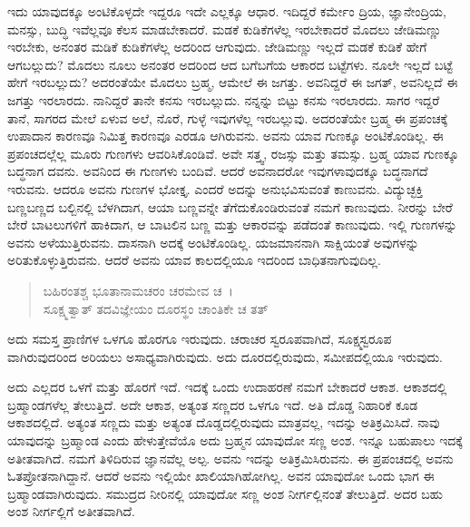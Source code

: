ಇದು ಯಾವುದಕ್ಕೂ ಅಂಟಿಕೊಳ್ಳದೇ ಇದ್ದರೂ ಇದೇ ಎಲ್ಲಕ್ಕೂ ಆಧಾರ. ಇದಿದ್ದರೆ ಕರ್ಮೇಂ ದ್ರಿಯ, ಜ್ಞಾನೇಂದ್ರಿಯ, ಮನಸ್ಸು, ಬುದ್ಧಿ ಇವೆಲ್ಲವೂ ಕೆಲಸ ಮಾಡಬೇಕಾದರೆ. ಮಡಕೆ ಕುಡಿಕೆಗಳೆಲ್ಲ ಇರಬೇಕಾದರೆ ಮೊದಲು ಜೇಡಿಮಣ್ಣು ಇರಬೇಕು, ಅನಂತರ ಮಡಿಕೆ ಕುಡಿಕೆಗಳೆಲ್ಲ ಅದರಿಂದ ಆಗುವುದು. ಜೇಡಿಮಣ್ಣು ಇಲ್ಲದೆ ಮಡಕೆ ಕುಡಿಕೆ ಹೇಗೆ ಆಗಬಲ್ಲುದು? ಮೊದಲು ನೂಲು ಅನಂತರ ಅದರಿಂದ ಆದ ಬಗೆಬಗೆಯ ಆಕಾರದ ಬಟ್ಟೆಗಳು. ನೂಲೇ ಇಲ್ಲದೆ ಬಟ್ಟೆ ಹೇಗೆ ಇರಬಲ್ಲುದು? ಅದರಂತೆಯೇ ಮೊದಲು ಬ್ರಹ್ಮ, ಆಮೇಲೆ ಈ ಜಗತ್ತು. ಅವನಿದ್ದರೆ ಈ ಜಗತ್, ಅವನಿಲ್ಲದೆ ಈ ಜಗತ್ತು ಇರಲಾರದು. ನಾನಿದ್ದರೆ ತಾನೇ ಕನಸು ಇರಬಲ್ಲುದು. ನನ್ನನ್ನು ಬಿಟ್ಟು ಕನಸು ಇರಲಾರದು. ಸಾಗರ ಇದ್ದರೆ ತಾನೆ, ಸಾಗರದ ಮೇಲೆ ಏಳುವ ಅಲೆ, ನೊರೆ, ಗುಳ್ಳೆ ಇವುಗಳೆಲ್ಲ ಇರಬಲ್ಲುವು. ಅದರಂತೆಯೇ ಬ್ರಹ್ಮ ಈ ಪ್ರಪಂಚಕ್ಕೆ ಉಪಾದಾನ ಕಾರಣವೂ ನಿಮಿತ್ತ ಕಾರಣವೂ ಎರಡೂ ಆಗಿರುವನು. ಅವನು ಯಾವ ಗುಣಕ್ಕೂ ಅಂಟಿಕೊಂಡಿಲ್ಲ. ಈ ಪ್ರಪಂಚದಲ್ಲೆಲ್ಲ ಮೂರು ಗುಣಗಳು ಆವರಿಸಿಕೊಂಡಿವೆ. ಅವೇ ಸತ್ತ್ವ, ರಜಸ್ಸು ಮತ್ತು ತಮಸ್ಸು. ಬ್ರಹ್ಮ ಯಾವ ಗುಣಕ್ಕೂ ಬದ್ಧನಾಗ ದವನು. ಅವನಿಂದ ಈ ಗುಣಗಳು ಬಂದಿವೆ. ಆದರೆ ಅವನಾದರೋ ಇವುಗಳಾವುದಕ್ಕೂ ಬದ್ಧನಾಗದೆ ಇರುವನು. ಆದರೂ ಅವನು ಗುಣಗಳ ಭೋಕ್ತೃ. ಎಂದರೆ ಅದನ್ನು ಅನುಭವಿಸುವಂತೆ ಕಾಣುವನು. ವಿದ್ಯುಚ್ಛಕ್ತಿ ಬಣ್ಣಬಣ್ಣದ ಬಲ್ಬಿನಲ್ಲಿ ಬೆಳಗಿದಾಗ, ಆಯಾ ಬಣ್ಣವನ್ನೇ ತೆಗೆದುಕೊಂಡಿರುವಂತೆ ನಮಗೆ ಕಾಣುವುದು. ನೀರನ್ನು ಬೇರೆ ಬೇರೆ ಬಾಟಲುಗಳಿಗೆ ಹಾಕಿದಾಗ, ಆ ಬಾಟಲಿನ ಬಣ್ಣ ಮತ್ತು ಆಕಾರವನ್ನು ಪಡೆದಂತೆ ಕಾಣುವುದು. ಇಲ್ಲಿ ಗುಣಗಳನ್ನು ಅವನು ಅಳೆಯುತ್ತಿರುವನು. ದಾಸನಾಗಿ ಅದಕ್ಕೆ ಅಂಟಿಕೊಂಡಿಲ್ಲ. ಯಜಮಾನನಾಗಿ ಸಾಕ್ಷಿಯಂತೆ ಅವುಗಳನ್ನು ಅರಿತುಕೊಳ್ಳುತ್ತಿರುವನು. ಆದರೆ ಅವನು ಯಾವ ಕಾಲದಲ್ಲಿಯೂ ಇದರಿಂದ ಬಾಧಿತನಾಗುವುದಿಲ್ಲ.

\begin{verse}
ಬಹಿರಂತಶ್ಚ ಭೂತಾನಾಮಚರಂ ಚರಮೇವ ಚ~।\\ಸೂಕ್ಷ್ಮತ್ವಾತ್ ತದವಿಜ್ಞೇಯಂ ದೂರಸ್ಥಂ ಚಾಂತಿಕೇ ಚ ತತ್ 
\end{verse}

{\small ಅದು ಸಮಸ್ತ ಪ್ರಾಣಿಗಳ ಒಳಗೂ ಹೊರಗೂ ಇರುವುದು. ಚರಾಚರ ಸ್ವರೂಪವಾಗಿದೆ, ಸೂಕ್ಷ್ಮಸ್ವರೂಪ ವಾಗಿರುವುದರಿಂದ ಅರಿಯಲು ಅಸಾಧ್ಯವಾಗಿರುವುದು. ಅದು ದೂರದಲ್ಲಿರುವುದು, ಸಮೀಪದಲ್ಲಿಯೂ ಇರುವುದು.}

ಅದು ಎಲ್ಲದರ ಒಳಗೆ ಮತ್ತು ಹೊರಗೆ ಇದೆ. ಇದಕ್ಕೆ ಒಂದು ಉದಾಹರಣೆ ನಮಗೆ ಬೇಕಾದರೆ ಆಕಾಶ. ಆಕಾಶದಲ್ಲಿ ಬ್ರಹ್ಮಾಂಡಗಳೆಲ್ಲ ತೇಲುತ್ತಿದೆ. ಅದೇ ಆಕಾಶ, ಅತ್ಯಂತ ಸಣ್ಣದರ ಒಳಗೂ ಇದೆ. ಅತಿ ದೊಡ್ಡ ನಿಹಾರಿಕೆ ಕೂಡ ಆಕಾಶದಲ್ಲಿದೆ. ಅತ್ಯಂತ ಸಣ್ಣದು ಮತ್ತು ಅತ್ಯಂತ ದೊಡ್ಡದಲ್ಲಿರುವುದು ಮಾತ್ರವಲ್ಲ, ಇದನ್ನು ಅತಿಕ್ರಮಿಸಿದೆ. ನಾವು ಯಾವುದನ್ನು ಬ್ರಹ್ಮಾಂಡ ಎಂದು ಹೇಳುತ್ತೇವೆಯೊ ಅದು ಬ್ರಹ್ಮನ ಯಾವುದೋ ಸಣ್ಣ ಅಂಶ. ಇನ್ನೂ ಬಹುಪಾಲು ಇದಕ್ಕೆ ಅತೀತವಾಗಿದೆ. ನಮಗೆ ತಿಳಿದಿರುವ ಜ್ಞಾನವೆಲ್ಲ ಅಲ್ಪ. ಅವನು ಇದನ್ನು ಅತಿಕ್ರಮಿಸಿರುವನು. ಈ ಪ್ರಪಂಚದಲ್ಲಿ ಅವನು ಓತಪ್ರೋತನಾಗಿದ್ದಾನೆ. ಆದರೆ ಅವನು ಇಲ್ಲಿಯೇ ಖಾಲಿಯಾಗಿಹೋಗಿಲ್ಲ. ಅವನ ಯಾವುದೋ ಒಂದು ಭಾಗ ಈ ಬ್ರಹ್ಮಾಂಡವಾಗಿರುವುದು. ಸಮುದ್ರದ ನೀರಿನಲ್ಲಿ ಯಾವುದೋ ಸಣ್ಣ ಅಂಶ ನೀರ್ಗಲ್ಲಿನಂತೆ  ತೇಲುತ್ತಿದೆ. ಅದರ ಬಹು ಅಂಶ ನೀರ್ಗಲ್ಲಿಗೆ ಅತೀತವಾಗಿದೆ.

